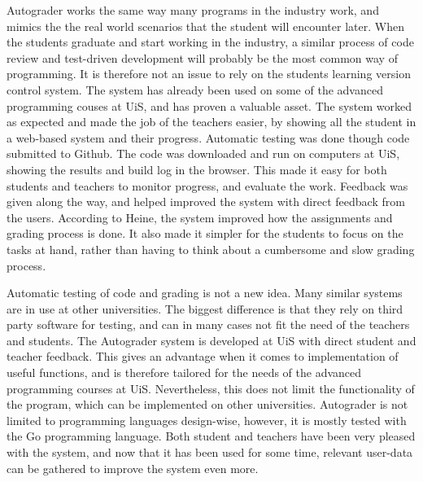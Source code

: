 Autograder works the same way many programs in the industry work, and mimics the the real world scenarios that the student will encounter later. When the students graduate and start working in the industry, a similar process of code review and test-driven development will probably be the most common way of programming. It is therefore not an issue to rely on the students learning version control system. The system has already been used on some of the advanced programming couses at UiS, and has proven a valuable asset. The system worked as expected and made the job of the teachers easier, by showing all the student in a web-based system and their progress. Automatic testing was done though code submitted to Github. The code was downloaded and run on computers at UiS, showing the results and build log in the browser. This made it easy for both students and teachers to monitor progress, and evaluate the work. Feedback was given along the way, and helped improved the system with direct feedback from the users. According to Heine, the system improved how the assignments and grading process is done. It also made it simpler for the students to focus on the tasks at hand, rather than having to think about a cumbersome and slow grading process.

Automatic testing of code and grading is not a new idea. Many similar systems are in use at other universities. The biggest difference is that they rely on third party software for testing, and can in many cases not fit the need of the teachers and students. The Autograder system is developed at UiS with direct student and teacher feedback. This gives an advantage when it comes to implementation of useful functions, and is therefore tailored for the needs of the advanced programming courses at UiS. Nevertheless, this does not limit the functionality of the program, which can be implemented on other universities. Autograder is not limited to programming languages design-wise, however, it is mostly tested with the Go programming language. Both student and teachers have been very pleased with the system, and now that it has been used for some time, relevant user-data can be gathered to improve the system even more.
